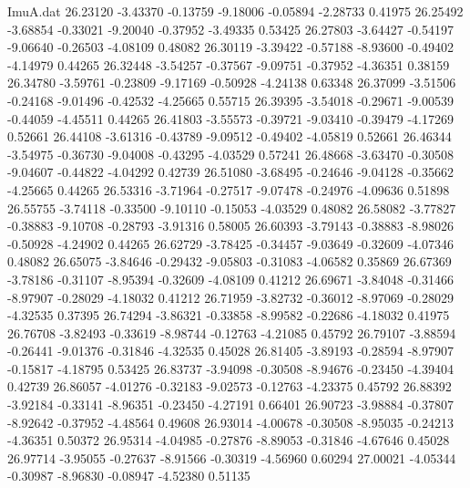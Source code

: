 \begin{filecontents}{ImuA.dat}
  26.23120   -3.43370   -0.13759   -9.18006   -0.05894   -2.28733    0.41975
  26.25492   -3.68854   -0.33021   -9.20040   -0.37952   -3.49335    0.53425
  26.27803   -3.64427   -0.54197   -9.06640   -0.26503   -4.08109    0.48082
  26.30119   -3.39422   -0.57188   -8.93600   -0.49402   -4.14979    0.44265
  26.32448   -3.54257   -0.37567   -9.09751   -0.37952   -4.36351    0.38159
  26.34780   -3.59761   -0.23809   -9.17169   -0.50928   -4.24138    0.63348
  26.37099   -3.51506   -0.24168   -9.01496   -0.42532   -4.25665    0.55715
  26.39395   -3.54018   -0.29671   -9.00539   -0.44059   -4.45511    0.44265
  26.41803   -3.55573   -0.39721   -9.03410   -0.39479   -4.17269    0.52661
  26.44108   -3.61316   -0.43789   -9.09512   -0.49402   -4.05819    0.52661
  26.46344   -3.54975   -0.36730   -9.04008   -0.43295   -4.03529    0.57241
  26.48668   -3.63470   -0.30508   -9.04607   -0.44822   -4.04292    0.42739
  26.51080   -3.68495   -0.24646   -9.04128   -0.35662   -4.25665    0.44265
  26.53316   -3.71964   -0.27517   -9.07478   -0.24976   -4.09636    0.51898
  26.55755   -3.74118   -0.33500   -9.10110   -0.15053   -4.03529    0.48082
  26.58082   -3.77827   -0.38883   -9.10708   -0.28793   -3.91316    0.58005
  26.60393   -3.79143   -0.38883   -8.98026   -0.50928   -4.24902    0.44265
  26.62729   -3.78425   -0.34457   -9.03649   -0.32609   -4.07346    0.48082
  26.65075   -3.84646   -0.29432   -9.05803   -0.31083   -4.06582    0.35869
  26.67369   -3.78186   -0.31107   -8.95394   -0.32609   -4.08109    0.41212
  26.69671   -3.84048   -0.31466   -8.97907   -0.28029   -4.18032    0.41212
  26.71959   -3.82732   -0.36012   -8.97069   -0.28029   -4.32535    0.37395
  26.74294   -3.86321   -0.33858   -8.99582   -0.22686   -4.18032    0.41975
  26.76708   -3.82493   -0.33619   -8.98744   -0.12763   -4.21085    0.45792
  26.79107   -3.88594   -0.26441   -9.01376   -0.31846   -4.32535    0.45028
  26.81405   -3.89193   -0.28594   -8.97907   -0.15817   -4.18795    0.53425
  26.83737   -3.94098   -0.30508   -8.94676   -0.23450   -4.39404    0.42739
  26.86057   -4.01276   -0.32183   -9.02573   -0.12763   -4.23375    0.45792
  26.88392   -3.92184   -0.33141   -8.96351   -0.23450   -4.27191    0.66401
  26.90723   -3.98884   -0.37807   -8.92642   -0.37952   -4.48564    0.49608
  26.93014   -4.00678   -0.30508   -8.95035   -0.24213   -4.36351    0.50372
  26.95314   -4.04985   -0.27876   -8.89053   -0.31846   -4.67646    0.45028
  26.97714   -3.95055   -0.27637   -8.91566   -0.30319   -4.56960    0.60294
  27.00021   -4.05344   -0.30987   -8.96830   -0.08947   -4.52380    0.51135

\end{filecontents}
